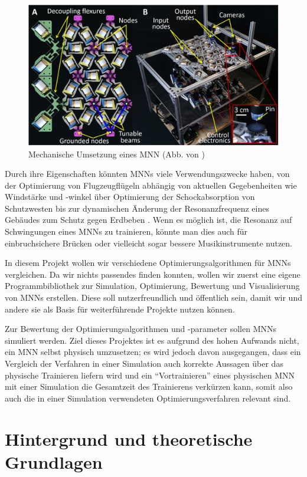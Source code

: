 \documentclass[10pt]{scrartcl}
\begin{document}
\begin{figure}[htb!]
    \centering
    \includegraphics[width=0.65\linewidth]{bilder/mnn2-1.jpg}
    \caption{Mechanische Umsetzung eines MNN (Abb. von \cite{Lee2022})}
    \label{fig:mnn2-1}
\end{figure}

Durch ihre Eigenschaften könnten MNNs viele Verwendungszwecke haben, von der Optimierung von Flugzeugflügeln abhängig von aktuellen Gegebenheiten wie Windstärke und -winkel \cite[2]{Lee2022} über Optimierung der Schockabsorption von Schutzwesten bis zur dynamischen Änderung der Resonanzfrequenz eines Gebäudes zum Schutz gegen Erdbeben \cite[9]{Hopkins2023}.
Wenn es möglich ist, die Resonanz auf Schwingungen eines MNNs zu trainieren, könnte man dies auch für einbruchsichere Brücken oder vielleicht sogar bessere Musikinstrumente nutzen.

In diesem Projekt wollen wir verschiedene Optimierungsalgorithmen für MNNs vergleichen.
Da wir nichts passendes finden konnten, wollen wir zuerst eine eigene Programmbibliothek zur Simulation, Optimierung, Bewertung und Visualisierung von MNNs erstellen.
Diese soll nutzerfreundlich und öffentlich sein, damit wir und andere sie als Basis für weiterführende Projekte nutzen können.

Zur Bewertung der Optimierungsalgorithmen und -parameter sollen MNNs simuliert werden.
Ziel dieses Projektes ist es aufgrund des hohen Aufwands nicht, ein MNN selbst physisch umzusetzen;
es wird jedoch davon ausgegangen, dass ein Vergleich der Verfahren in einer Simulation auch korrekte Aussagen über das physische Trainieren liefern wird und ein \enquote{Vortrainieren} eines physischen MNN mit einer Simulation die Gesamtzeit des Trainierens verkürzen kann, somit also auch die in einer Simulation verwendeten Optimierungsverfahren relevant sind.

\newpage
\FloatBarrier
\section{Hintergrund und theoretische Grundlagen}
\end{document}
